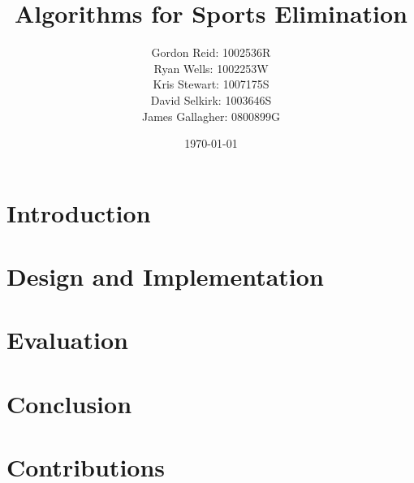 \documentclass{l3proj}
\begin{document}
\title{Algorithms for Sports Elimination}

\author{
    Gordon Reid: 1002536R\\
    Ryan Wells: 1002253W\\
    Kris Stewart: 1007175S\\
    David Selkirk: 1003646S\\
    James Gallagher: 0800899G\\
}

\date{\today}

\maketitle

\begin{abstract}

\end{abstract}

\renewcommand{\abstractname}{Acknowledgements}

\begin{abstract}

\end{abstract}

\educationalconsent

\tableofcontents

\chapter{Introduction}


\chapter{Design and Implementation}


\chapter{Evaluation}



\chapter{Conclusion}


\chapter{Contributions}


\appendix




\end{document}
